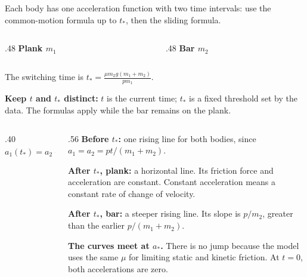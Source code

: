 \begin{solutionframe}
  \par
  Each body has one acceleration function with two time intervals:
  use the common-motion formula up to \(t_*\), then the sliding formula.

  \medskip
  \begin{columns}[T,onlytextwidth]
    \begin{column}{.48\textwidth}
      \textbf{Plank \(m_1\)}
    \end{column}
    \begin{column}{.48\textwidth}
      \textbf{Bar \(m_2\)}
    \end{column}
  \end{columns}
  \medskip
  The switching time is
  \(\displaystyle t_*=\frac{\mu m_2g(m_1+m_2)}{pm_1}.\)
  \medskip

  \textbf{Keep \(t\) and \(t_*\) distinct:}
  \(t\) is the current time; \(t_*\) is a fixed threshold set by the data.
  The formulas apply while the bar remains on the plank.
\end{solutionframe}

\begin{solutionframe}
  \begin{columns}[T,onlytextwidth]
    \begin{column}{.40\textwidth}
      \[
        a_1(t_*)=a_2(t_*)=\frac{\mu m_2g}{m_1}\equiv a_*.
      \]
    \end{column}
    \begin{column}{.56\textwidth}
      \textbf{Before \(t_*\):} one rising line for both bodies,
      since \(a_1=a_2=pt/(m_1+m_2)\).

      \medskip
      \textbf{After \(t_*\), plank:} a horizontal line.
      Its friction force and acceleration are constant.
      Constant acceleration means a constant rate of change of velocity.

      \medskip
      \textbf{After \(t_*\), bar:} a steeper rising line.
      Its slope is \(p/m_2\), greater than the earlier
      \(p/(m_1+m_2)\).

      \medskip
      \textbf{The curves meet at \(a_*\).} There is no jump because the model
      uses the same \(\mu\) for limiting static and kinetic friction.
      At \(t=0\), both accelerations are zero.
    \end{column}
  \end{columns}
\end{solutionframe}

